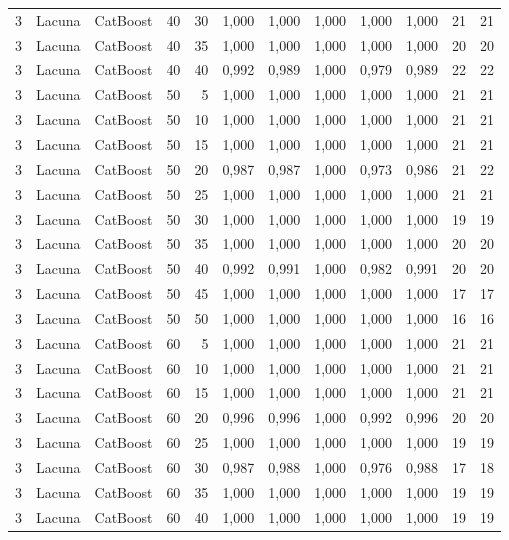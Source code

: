 \begin{longtable}{@{}rllrrrrrrrrr@{}}
3 & Lacuna & CatBoost & 40 & 30 & 1,000 & 1,000 & 1,000 & 1,000 & 1,000 & 21 & 21 \\
3 & Lacuna & CatBoost & 40 & 35 & 1,000 & 1,000 & 1,000 & 1,000 & 1,000 & 20 & 20 \\
3 & Lacuna & CatBoost & 40 & 40 & 0,992 & 0,989 & 1,000 & 0,979 & 0,989 & 22 & 22 \\
3 & Lacuna & CatBoost & 50 & 5 & 1,000 & 1,000 & 1,000 & 1,000 & 1,000 & 21 & 21 \\
3 & Lacuna & CatBoost & 50 & 10 & 1,000 & 1,000 & 1,000 & 1,000 & 1,000 & 21 & 21 \\
3 & Lacuna & CatBoost & 50 & 15 & 1,000 & 1,000 & 1,000 & 1,000 & 1,000 & 21 & 21 \\
3 & Lacuna & CatBoost & 50 & 20 & 0,987 & 0,987 & 1,000 & 0,973 & 0,986 & 21 & 22 \\
3 & Lacuna & CatBoost & 50 & 25 & 1,000 & 1,000 & 1,000 & 1,000 & 1,000 & 21 & 21 \\
3 & Lacuna & CatBoost & 50 & 30 & 1,000 & 1,000 & 1,000 & 1,000 & 1,000 & 19 & 19 \\
3 & Lacuna & CatBoost & 50 & 35 & 1,000 & 1,000 & 1,000 & 1,000 & 1,000 & 20 & 20 \\
3 & Lacuna & CatBoost & 50 & 40 & 0,992 & 0,991 & 1,000 & 0,982 & 0,991 & 20 & 20 \\
3 & Lacuna & CatBoost & 50 & 45 & 1,000 & 1,000 & 1,000 & 1,000 & 1,000 & 17 & 17 \\
3 & Lacuna & CatBoost & 50 & 50 & 1,000 & 1,000 & 1,000 & 1,000 & 1,000 & 16 & 16 \\
3 & Lacuna & CatBoost & 60 & 5 & 1,000 & 1,000 & 1,000 & 1,000 & 1,000 & 21 & 21 \\
3 & Lacuna & CatBoost & 60 & 10 & 1,000 & 1,000 & 1,000 & 1,000 & 1,000 & 21 & 21 \\
3 & Lacuna & CatBoost & 60 & 15 & 1,000 & 1,000 & 1,000 & 1,000 & 1,000 & 21 & 21 \\
3 & Lacuna & CatBoost & 60 & 20 & 0,996 & 0,996 & 1,000 & 0,992 & 0,996 & 20 & 20 \\
3 & Lacuna & CatBoost & 60 & 25 & 1,000 & 1,000 & 1,000 & 1,000 & 1,000 & 19 & 19 \\
3 & Lacuna & CatBoost & 60 & 30 & 0,987 & 0,988 & 1,000 & 0,976 & 0,988 & 17 & 18 \\
3 & Lacuna & CatBoost & 60 & 35 & 1,000 & 1,000 & 1,000 & 1,000 & 1,000 & 19 & 19 \\
3 & Lacuna & CatBoost & 60 & 40 & 1,000 & 1,000 & 1,000 & 1,000 & 1,000 & 19 & 19 \\

\end{longtable}

